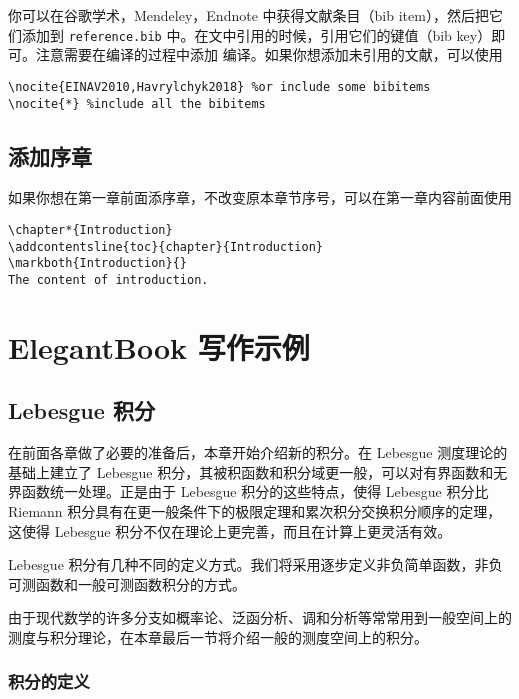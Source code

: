 \documentclass[cn,11pt,fancy]{elegantbook}
\begin{document}
你可以在谷歌学术，Mendeley，Endnote 中获得文献条目（bib item），然后把它们添加到 \lstinline{reference.bib} 中。在文中引用的时候，引用它们的键值（bib key）即可。注意需要在编译的过程中添加  编译。如果你想添加未引用的文献，可以使用
\begin{lstlisting}[frame=single]
\nocite{EINAV2010,Havrylchyk2018} %or include some bibitems
\nocite{*} %include all the bibitems
\end{lstlisting}

\section{添加序章}

如果你想在第一章前面添序章，不改变原本章节序号，可以在第一章内容前面使用 
\begin{lstlisting}
\chapter*{Introduction}
\addcontentsline{toc}{chapter}{Introduction} 
\markboth{Introduction}{} 
The content of introduction.
\end{lstlisting}

\chapter{ElegantBook 写作示例}

\section{Lebesgue 积分}
在前面各章做了必要的准备后，本章开始介绍新的积分。在 Lebesgue 测度理论的基础上建立了 Lebesgue 积分，其被积函数和积分域更一般，可以对有界函数和无界函数统一处理。正是由于 Lebesgue 积分的这些特点，使得 Lebesgue 积分比 Riemann 积分具有在更一般条件下的极限定理和累次积分交换积分顺序的定理，这使得 Lebesgue 积分不仅在理论上更完善，而且在计算上更灵活有效。

Lebesgue 积分有几种不同的定义方式。我们将采用逐步定义非负简单函数，非负可测函数和一般可测函数积分的方式。

由于现代数学的许多分支如概率论、泛函分析、调和分析等常常用到一般空间上的测度与积分理论，在本章最后一节将介绍一般的测度空间上的积分。

\subsection{积分的定义}
\end{document}
